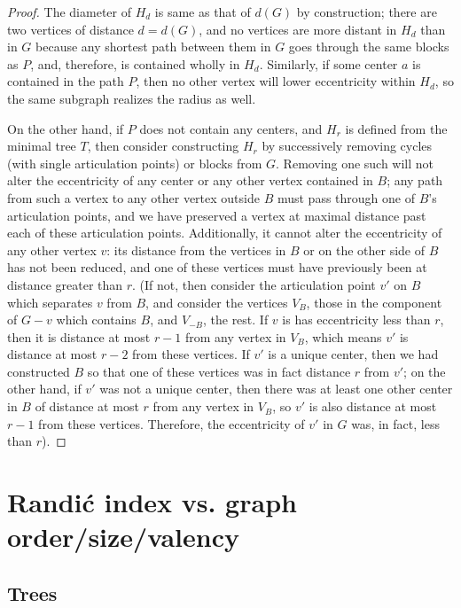\documentclass{amsart}
\theoremstyle{definition}
\begin{document}
\begin{proof}
The diameter of $H_d$ is same as that of $d(G)$ by construction; there are two vertices of distance $d=d(G)$, and no vertices are more distant in $H_d$ than in $G$ because any shortest path between them in $G$ goes through the same blocks as $P$, and, therefore, is contained wholly in $H_d$. Similarly, if some center $a$ is contained in the path $P$, then no other vertex will lower eccentricity within $H_d$, so the same subgraph realizes the radius as well. 

On the other hand, if $P$ does not contain any centers, and $H_r$ is defined from the minimal tree $T$, then consider constructing $H_r$ by successively removing cycles (with single articulation points) or blocks from $G$. Removing one such will not alter the eccentricity of any center or any other vertex contained in $B$; any path from such a vertex to any other vertex outside $B$ must pass through one of $B$'s articulation points, and we have preserved a vertex at maximal distance past each of these articulation points. Additionally, it cannot alter the eccentricity of any other vertex $v$: its distance from the vertices in $B$ or on the other side of $B$ has not been reduced, and one of these vertices must have previously been at distance greater than $r$. (If not, then consider the articulation point $v'$ on $B$ which separates $v$ from $B$, and consider the vertices $V_B$, those in the component of $G-v$ which contains $B$, and $V_{-B}$, the rest. If $v$ is has eccentricity less than $r$, then it is distance at most $r-1$ from any vertex in $V_B$, which means $v'$ is distance at most $r-2$ from these vertices. If $v'$ is a unique center, then we had constructed $B$ so that one of these vertices was in fact distance $r$ from $v'$; on the other hand, if $v'$ was not a unique center, then there was at least one other center in $B$ of distance at most $r$ from any vertex in $V_{B}$, so $v'$ is also distance at most $r-1$ from these vertices. Therefore, the eccentricity of $v'$ in $G$ was, in fact, less than $r$).
\end{proof}


\section{Randi\'c index vs. graph order/size/valency}\label{sec:osv}

\subsection{Trees} 
\end{document}
